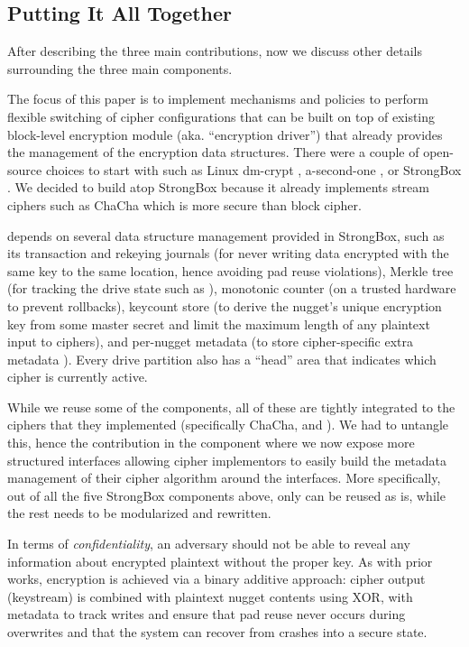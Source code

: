 \subsection{Putting It All Together}\label{subsec:summary}

After describing the three main contributions, now we discuss other details
surrounding the three main components.


 The focus of this paper is to implement
mechanisms and policies to perform flexible switching of cipher configurations
that can be built on top of existing block-level encryption module (aka.
``encryption driver'') that already provides the management of the encryption
data structures. There were a couple of open-source choices to start with such
as Linux dm-crypt \cite{x}, a-second-one \cite{y}, or StrongBox
\cite{StrongBox}. We decided to build atop StrongBox because it already
implements stream ciphers such as ChaCha which is more secure than block cipher.

\sys depends on several data structure management provided in StrongBox, such as
its transaction and rekeying journals (for never writing data encrypted with the
same key to the same location, hence avoiding pad reuse violations), Merkle tree
(for tracking the drive state such as ), monotonic
counter (on a trusted hardware to prevent rollbacks), keycount store (to derive
the nugget's unique encryption key from some master secret and limit the maximum
length of any plaintext input to ciphers), and per-nugget metadata (to store
cipher-specific extra metadata ). Every drive partition also has a
``head'' area that indicates which cipher is currently active.

While we reuse some of the components, all of these are tightly integrated to
the ciphers that they implemented (specifically ChaCha, and \xxx). We had to
untangle this, hence the contribution in the \sysB component where we now expose
more structured interfaces allowing cipher implementors to easily build the
metadata management of their cipher algorithm around the interfaces. More
specifically, out of all the five  StrongBox components above, only
\xxx can be reused as is, while the rest needs to be modularized and rewritten.


 In terms of {\em confidentiality}, an
adversary should not be able to reveal any information about encrypted plaintext
without the proper key. As with prior works, encryption is achieved via a binary
additive approach: cipher output (keystream) is combined with plaintext nugget
contents using XOR, with metadata to track writes and ensure that pad reuse
never occurs during overwrites and that the system can recover from crashes into
a secure state.

